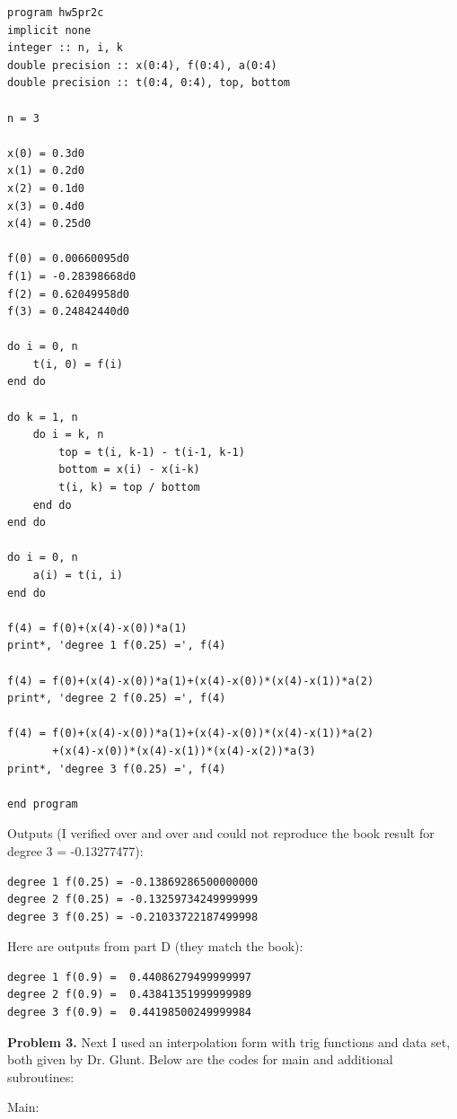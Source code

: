\documentclass[12pt]{article}
\begin{document}
\begin{verbatim}
program hw5pr2c
implicit none
integer :: n, i, k
double precision :: x(0:4), f(0:4), a(0:4)
double precision :: t(0:4, 0:4), top, bottom

n = 3

x(0) = 0.3d0
x(1) = 0.2d0
x(2) = 0.1d0
x(3) = 0.4d0
x(4) = 0.25d0

f(0) = 0.00660095d0
f(1) = -0.28398668d0
f(2) = 0.62049958d0
f(3) = 0.24842440d0

do i = 0, n
	t(i, 0) = f(i)
end do

do k = 1, n
	do i = k, n 
		top = t(i, k-1) - t(i-1, k-1)
		bottom = x(i) - x(i-k)
		t(i, k) = top / bottom
	end do
end do

do i = 0, n
	a(i) = t(i, i)
end do

f(4) = f(0)+(x(4)-x(0))*a(1)
print*, 'degree 1 f(0.25) =', f(4)

f(4) = f(0)+(x(4)-x(0))*a(1)+(x(4)-x(0))*(x(4)-x(1))*a(2)
print*, 'degree 2 f(0.25) =', f(4)

f(4) = f(0)+(x(4)-x(0))*a(1)+(x(4)-x(0))*(x(4)-x(1))*a(2)
       +(x(4)-x(0))*(x(4)-x(1))*(x(4)-x(2))*a(3)
print*, 'degree 3 f(0.25) =', f(4)

end program
\end{verbatim}

Outputs (I verified over and over and could not reproduce the book result for degree 3 = -0.13277477):

\begin{verbatim}
degree 1 f(0.25) = -0.13869286500000000
degree 2 f(0.25) = -0.13259734249999999
degree 3 f(0.25) = -0.21033722187499998
\end{verbatim}

Here are outputs from part D (they match the book):

\begin{verbatim}
degree 1 f(0.9) =  0.44086279499999997
degree 2 f(0.9) =  0.43841351999999989
degree 3 f(0.9) =  0.44198500249999984
\end{verbatim}

\bigskip

\textbf{Problem 3.} Next I used an interpolation form with trig functions and data set, both given by Dr. Glunt. Below are the codes for main and additional subroutines:

Main:
\end{document}

